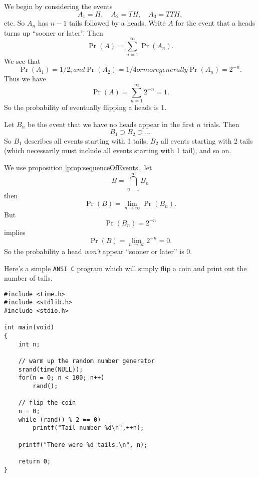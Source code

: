 We begin by considering the events
\begin{equation}
A_{1}=H,\quad A_{2}=TH,\quad A_{3}=TTH,
\end{equation}
etc. So $A_{n}$ has $n-1$ tails followed by a heads. Write $A$ for the
event that a heads turns up ``sooner or later''. Then
\begin{equation}
\Pr(A)=\sum_{n=1}^{\infty}\Pr(A_{n}).
\end{equation}
We see that
\begin{subequations}
\begin{equation}
\Pr(A_{1})=1/2,
\end{equation}
and
\begin{equation}
\Pr(A_{2})=1/4
\end{equation}
or more generally
\begin{equation}
\Pr(A_{n})=2^{-n}.
\end{equation}
\end{subequations}
Thus we have
\begin{equation}
\Pr(A)=\sum^{\infty}_{n=1}2^{-n}=1.
\end{equation}
So the probability of eventually flipping a heads is 1.

Let $B_{n}$ be the event that we have no heads appear in the first $n$
trials. Then
\begin{equation}
B_{1}\supset B_{2}\supset\dots
\end{equation}
So $B_{1}$ describes all events starting with 1 tails, $B_{2}$ all
events starting with 2 tails (which necessarily must include all events
starting with 1 tail), and so on.

We use proposition \ref{prop:sequenceOfEvents}, let
\begin{equation}
B=\bigcap^{\infty}_{n=1}B_{n}
\end{equation}
then
\begin{equation}
\Pr(B)=\lim_{n\to\infty}\Pr(B_{n}).
\end{equation}
But
\begin{equation}
\Pr(B_{n})=2^{-n}
\end{equation}
implies
\begin{equation}
\Pr(B)=\lim_{n\to\infty}2^{-n}=0.
\end{equation}
So the probability a head \emph{won't} appear ``sooner or later'' is 0. 

Here's a simple {\tt ANSI C} program which will simply flip a coin and print
out the number of tails.

\begin{Verbatim}[fontsize=\small]
#include <time.h>
#include <stdlib.h>
#include <stdio.h>

int main(void)
{
    int n;

    // warm up the random number generator
    srand(time(NULL));
    for(n = 0; n < 100; n++) 
        rand(); 

    // flip the coin
    n = 0;
    while (rand() % 2 == 0) 
        printf("Tail number %d\n",++n);

    printf("There were %d tails.\n", n);

    return 0;
}
\end{Verbatim}
